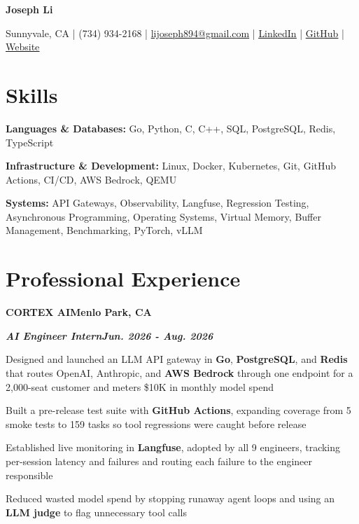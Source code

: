 \documentclass[10pt]{article}
\renewcommand{\resumeheader}[2]{%
  {\centering\fontsize{16}{18}\selectfont\bfseries #1\par}%
  \vspace{4pt}%
  {\centering\fontsize{10.5}{13}\selectfont #2\par}%
  \vspace{6pt}%
}
\renewcommand{\skill}[2]{\textbf{#1:} #2\par\vspace{1.5pt}}
\newcommand{\job}[4]{%
  \vspace{0pt}%
  \textbf{\MakeUppercase{#1}}\hfill\textbf{#2}\par
  \vspace{0.5pt}%
  \textbf{\textit{#3}}\hfill\textbf{\textit{#4}}\par
}
\begin{document}
\resumeheader{Joseph Li}{%
Sunnyvale, CA | (734) 934-2168 | \href{mailto:lijoseph894@gmail.com}{lijoseph894@gmail.com} | \href{https://www.linkedin.com/in/lijoseph894/}{\underline{LinkedIn}} | \href{https://github.com/josephl894}{\underline{GitHub}} | \href{https://josephl894.github.io}{\underline{Website}}}

\section{Skills}
\skill{Languages \& Databases}{Go, Python, C, C++, SQL, PostgreSQL, Redis, TypeScript}
\skill{Infrastructure \& Development}{Linux, Docker, Kubernetes, Git, GitHub Actions, CI/CD, AWS Bedrock, QEMU}
\skill{Systems}{API Gateways, Observability, Langfuse, Regression Testing, Asynchronous Programming, Operating Systems, Virtual Memory, Buffer Management, Benchmarking, PyTorch, vLLM}

\section{Professional Experience}
\job{Cortex AI}{Menlo Park, CA}{AI Engineer Intern}{Jun. 2026 - Aug. 2026}
\begin{bullets}
  \item Designed and launched an LLM API gateway in \textbf{Go}, \textbf{PostgreSQL}, and \textbf{Redis} that routes OpenAI, Anthropic, and \textbf{AWS Bedrock} through one endpoint for a 2,000-seat customer and meters \$10K in monthly model spend
  \item Built a pre-release test suite with \textbf{GitHub Actions}, expanding coverage from 5 smoke tests to 159 tasks so tool regressions were caught before release
  \item Established live monitoring in \textbf{Langfuse}, adopted by all 9 engineers, tracking per-session latency and failures and routing each failure to the engineer responsible
  \item Reduced wasted model spend by stopping runaway agent loops and using an \textbf{LLM judge} to flag unnecessary tool calls
\end{bullets}
\end{document}
